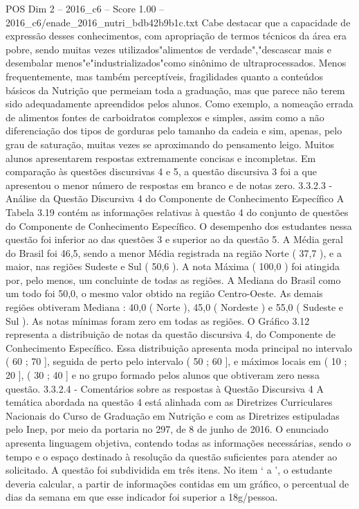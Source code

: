 \begin{textsample}{POS Dim 2 – 2016\_c6 – Score 1.00 – 2016\_c6/enade\_2016\_nutri\_bdb42b9b1c.txt}
Cabe destacar que a capacidade de expressão desses conhecimentos, com apropriação de termos técnicos da área era pobre, sendo muitas vezes utilizados"alimentos de verdade","descascar mais e desembalar menos"e"industrializados"como sinônimo de ultraprocessados.
Menos frequentemente, mas também perceptíveis, fragilidades quanto a conteúdos básicos da Nutrição que permeiam toda a graduação, mas que parece não terem sido adequadamente apreendidos pelos alunos.
Como exemplo, a nomeação errada de alimentos fontes de carboidratos complexos e simples, assim como a não diferenciação dos tipos de gorduras pelo tamanho da cadeia e sim, apenas, pelo grau de saturação, muitas vezes se aproximando do pensamento leigo.
Muitos alunos apresentarem respostas extremamente concisas e incompletas.
Em comparação às questões discursivas 4 e 5, a questão discursiva 3 foi a que apresentou o menor número de respostas em branco e de notas zero. 3.3.2.3 - Análise da Questão Discursiva 4 do Componente de Conhecimento Específico A Tabela 3.19 contém as informações relativas à questão 4 do conjunto de questões do Componente de Conhecimento Específico.
O desempenho dos estudantes nessa questão foi inferior ao das questões 3 e superior ao da questão 5.
A Média geral do Brasil foi 46,5, sendo a menor Média registrada na região Norte ( 37,7 ), e a maior, nas regiões Sudeste e Sul ( 50,6 ).
A nota Máxima ( 100,0 ) foi atingida por, pelo menos, um concluinte de todas as regiões.
A Mediana do Brasil como um todo foi 50,0, o mesmo valor obtido na região Centro-Oeste.
As demais regiões obtiveram Mediana : 40,0 ( Norte ), 45,0 ( Nordeste ) e 55,0 ( Sudeste e Sul ).
As notas mínimas foram zero em todas as regiões.
O Gráfico 3.12 representa a distribuição de notas da questão discursiva 4, do Componente de Conhecimento Específico.
Essa distribuição apresenta moda principal no intervalo ( 60 ; 70 ], seguida de perto pelo intervalo ( 50 ; 60 ], e máximos locais em ( 10 ; 20 ], ( 30 ; 40 ] e no grupo formado pelos alunos que obtiveram zero nessa questão. 3.3.2.4 - Comentários sobre as respostas à Questão Discursiva 4 A temática abordada na questão 4 está alinhada com as Diretrizes Curriculares Nacionais do Curso de Graduação em Nutrição e com as Diretrizes estipuladas pelo Inep, por meio da portaria no 297, de 8 de junho de 2016.
O enunciado apresenta linguagem objetiva, contendo todas as informações necessárias, sendo o tempo e o espaço destinado à resolução da questão suficientes para atender ao solicitado.
A questão foi subdividida em três itens.
No item ‘ a ’, o estudante deveria calcular, a partir de informações contidas em um gráfico, o percentual de dias da semana em que esse indicador foi superior a 18g/pessoa.

\end{textsample}
